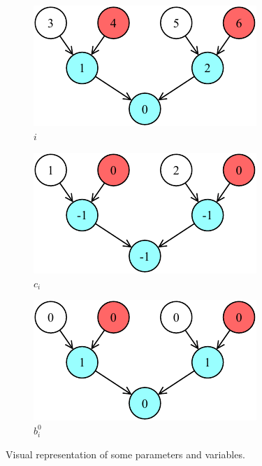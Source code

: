 \documentclass[letterpaper,10pt]{article}
\begin{document}
\begin{figure}[hbtp]
    \centering
    \begin{subfigure}[b]{0.30\textwidth}
          \includegraphics[width=\textwidth]{i.pdf}
          \caption{$i$}
          \label{subfig:i}
    \end{subfigure}
    \hspace{0.01\textwidth}
    \begin{subfigure}[b]{0.30\textwidth}
        \includegraphics[width=\textwidth]{ci.pdf}
        \caption{$c_i$}
        \label{subfig:ci}
    \end{subfigure}
    \hspace{0.01\textwidth}
    \begin{subfigure}[b]{0.30\textwidth}
        \includegraphics[width=\textwidth]{bit.pdf}
        \caption{$b_i^0$}
        \label{subfig:bit}
    \end{subfigure}
    \caption{Visual representation of some parameters and variables.}
    \label{fig:variables}
\end{figure}
\end{document}
